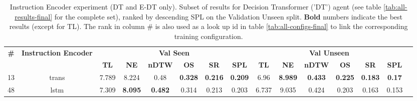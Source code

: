 \begin{table}
\centering
\caption{\label{tab:dt_instruction_encoding}Instruction Encoder experiment (DT and E-DT only). Subset of results for Decision Transformer ('DT') agent (see table \ref{tab:all-results-final} for the complete set), ranked by descending SPL on the Validation Unseen split. \textbf{Bold} numbers indicate the best results (except for TL). The rank in column \# is also used as a look up id in table \ref{tab:all-configs-final} to link the corresponding training configuration.}
\begin{tabular}{@{\hskip3pt}c@{\hskip3pt}c@{\hskip3pt}c@{\hskip3pt}c@{\hskip3pt}c@{\hskip3pt}c@{\hskip3pt}c@{\hskip3pt}c@{\hskip3pt}c@{\hskip3pt}c@{\hskip3pt}c@{\hskip3pt}c@{\hskip3pt}c@{\hskip3pt}c@{\hskip3pt}c}
\toprule
                                  \textbf{\#} & \textbf{Instruction Encoder} & \multicolumn{6}{c}{\textbf{Val Seen}} & \multicolumn{6}{c}{\textbf{Val Unseen}} \\
\cmidrule(l){3-8}\cmidrule(l){9-14}\textbf{~} &                   \textbf{~} &       \textbf{TL} &     \textbf{NE} &   \textbf{nDTW} &     \textbf{OS} &     \textbf{SR} &    \textbf{SPL} &         \textbf{TL} &     \textbf{NE} &   \textbf{nDTW} &     \textbf{OS} &     \textbf{SR} &   \textbf{SPL} \\
\midrule
                                           13 &                        trans &             7.789 &           8.224 &            0.48 &  \textbf{0.328} &  \textbf{0.216} &  \textbf{0.209} &                6.96 &  \textbf{8.989} &  \textbf{0.433} &  \textbf{0.225} &  \textbf{0.183} &  \textbf{0.17} \\
                                           48 &                         lstm &             7.309 &  \textbf{8.095} &  \textbf{0.482} &           0.314 &           0.213 &           0.203 &               6.737 &           9.035 &           0.424 &           0.203 &           0.163 &          0.153 \\
\bottomrule
\end{tabular}
\end{table}
